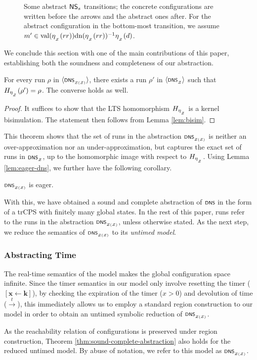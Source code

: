 \begin{figure}
{{}}
	\captionsetup{skip=8pt}
	\caption{\label{fig:dns-abstraction}Some abstract $\mathsf{NS}_{s}$ transitions; the concrete configurations are written before the arrows and the abstract ones after. For the abstract configuration in the bottom-most transition, we assume $m' \in \text{val}(\eta_{_{_{\mathcal Z}}}(rr))\text{dn}(\eta_{_{_{\mathcal Z}}}(rr))^{-1}\eta_{_{_{\mathcal Z}}}(d)$.}
\end{figure}

We conclude this section with one of the main contributions of this paper, establishing both the soundness and completeness of our abstraction.

\begin{theorem}\label{thm:sound-complete-abstraction}
	For every run $\rho$ in $\tup{\abstraction}$, there exists a run $\rho'$ in $\tup{\scrsf{dns}\subsub{\cal Z}}$ such that $H_{\eta_{_{_{\mathcal Z}}}}(\rho') = \rho$. The converse holds as well.
\end{theorem}
\begin{proof}
	It suffices to show that the LTS homomorphism $H_{\eta_{_{_{\mathcal Z}}}}$  is a kernel bisimulation. The statement then follows from Lemma \ref{lem:bisim}.
\end{proof} 

This theorem shows that the set of runs in the abstraction $\abstraction$ is neither an over-approximation nor an under-approximation, but  captures the exact set of runs in $\scrsf{dns}\subsub{\cal Z}$, up to the homomorphic image with respect to $H_{\eta_{_{_{\mathcal Z}}}}$. Using Lemma \ref{lem:eager-dns}, we further have the following corollary.

\begin{corollary}\label{cor:eager-abstraction}
	$\abstraction$ is eager.
\end{corollary}

With this, we have obtained a sound and complete abstraction of $\scrsf{dns}$ in the form of a trCPS with finitely many global states. In the rest of this paper, runs refer to the runs in the abstraction $\abstraction$, unless otherwise stated. As the next step, we reduce the semantics of $\abstraction$ to its \emph{untimed model}.

\subsubsection*{Abstracting Time}
The real-time semantics of the model makes the global configuration space infinite. Since the timer semantics in our model only involve resetting the timer ($[\mathbf{x} \leftarrow \mathbf{k}]$), by checking the expiration of the timer ($x > 0$) and devolution of time ($\xrightarrow{t}$), this immediately allows us to employ a standard region construction \cite{alur1994theory} to our model in order to obtain an untimed symbolic reduction of $\abstraction$. 

As the reachability relation of configurations is preserved under region construction, Theorem \ref{thm:sound-complete-abstraction} also holds for the reduced untimed model. By abuse of notation, we refer to this model as $\abstraction$.
